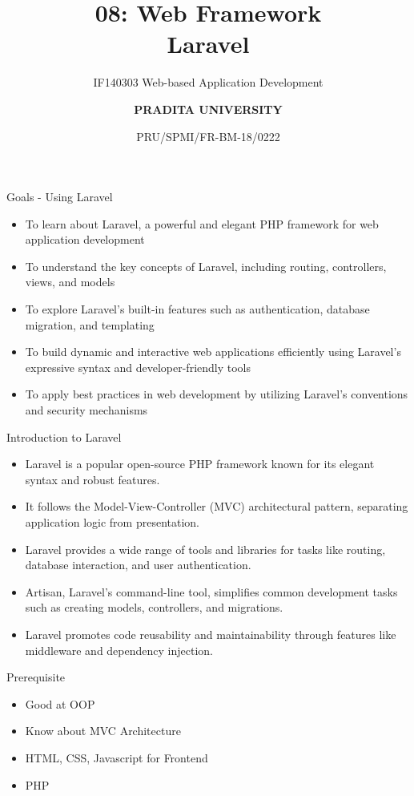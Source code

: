 \documentclass[aspectratio=169, table]{beamer}
\subtitle{IF140303 Web-based Application Development}
\title{\Huge {\textbf{08: Web Framework\\Laravel}}}
\date[Serial]{\scriptsize {PRU/SPMI/FR-BM-18/0222}}
\author[Pradita]{\small {\textbf{PRADITA UNIVERSITY}}}
\begin{document}
\begin{frame}
    \titlepage
\end{frame}

\begin{frame}{Goals - Using Laravel}
	\vspace{5mm}
    \begin{itemize}
        \item To learn about Laravel, a powerful and elegant PHP framework for web application development
        \item To understand the key concepts of Laravel, including routing, controllers, views, and models
        \item To explore Laravel's built-in features such as authentication, database migration, and templating
        \item To build dynamic and interactive web applications efficiently using Laravel's expressive syntax and developer-friendly tools
        \item To apply best practices in web development by utilizing Laravel's conventions and security mechanisms
    \end{itemize}
\end{frame}

\begin{frame}{Introduction to Laravel}
	\vspace{5mm}
    \begin{itemize}
        \item Laravel is a popular open-source PHP framework known for its elegant syntax and robust features.
        \item It follows the Model-View-Controller (MVC) architectural pattern, separating application logic from presentation.
        \item Laravel provides a wide range of tools and libraries for tasks like routing, database interaction, and user authentication.
        \item Artisan, Laravel's command-line tool, simplifies common development tasks such as creating models, controllers, and migrations.
        \item Laravel promotes code reusability and maintainability through features like middleware and dependency injection.
    \end{itemize}
\end{frame}

\begin{frame}{Prerequisite}
    \vspace{5mm}
    \begin{itemize}
        \item Good at OOP
        \item Know about MVC Architecture
        \item HTML, CSS, Javascript for Frontend
        \item PHP
    \end{itemize}
\end{frame}
\end{document}
